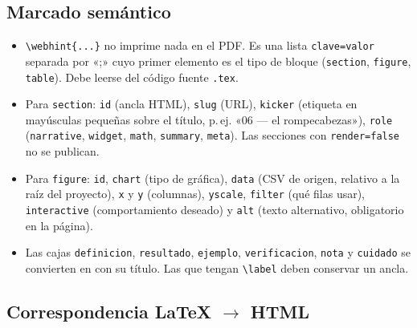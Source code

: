 \documentclass[11pt,a4paper]{article}
\begin{document}
\subsection{Marcado semántico}

\begin{itemize}[leftmargin=1.4em,itemsep=2pt]
  \item \texttt{\textbackslash webhint\{...\}} no imprime nada en el PDF. Es una lista \texttt{clave=valor} separada por «;» cuyo primer elemento es el tipo de bloque (\texttt{section}, \texttt{figure}, \texttt{table}). Debe leerse del código fuente \texttt{.tex}.
  \item Para \texttt{section}: \texttt{id} (ancla HTML), \texttt{slug} (URL), \texttt{kicker} (etiqueta en mayúsculas pequeñas sobre el título, p.\,ej. «06 --- el rompecabezas»), \texttt{role} (\texttt{narrative}, \texttt{widget}, \texttt{math}, \texttt{summary}, \texttt{meta}). Las secciones con \texttt{render=false} no se publican.
  \item Para \texttt{figure}: \texttt{id}, \texttt{chart} (tipo de gráfica), \texttt{data} (CSV de origen, relativo a la raíz del proyecto), \texttt{x} y \texttt{y} (columnas), \texttt{yscale}, \texttt{filter} (qué filas usar), \texttt{interactive} (comportamiento deseado) y \texttt{alt} (texto alternativo, obligatorio en la página).
  \item Las cajas \texttt{definicion}, \texttt{resultado}, \texttt{ejemplo}, \texttt{verificacion}, \texttt{nota} y \texttt{cuidado} se convierten en \texttt{} con su título. Las que tengan \texttt{\textbackslash label} deben conservar un ancla.
\end{itemize}

\subsection{Correspondencia LaTeX \texorpdfstring{$\rightarrow$}{->} HTML}
\end{document}
